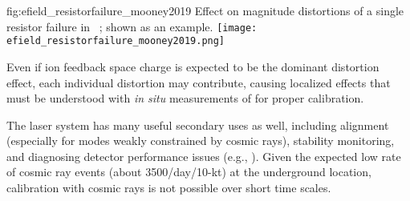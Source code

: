 \begin{dunefigure}{fig:efield_resistorfailure_mooney2019}
{Effect on \efield magnitude distortions of a single  resistor failure in ~\cite{bib:mooney2019a}; shown as an example. 
}
\texttt{[image: efield\_resistorfailure\_mooney2019.png]}
\end{dunefigure}


Even if ion feedback space charge is expected to be the dominant \efield distortion effect,
each individual \efield distortion may contribute, causing localized effects that must be understood with \textit{in situ} measurements of \efield for proper calibration. 

The laser system has many useful secondary uses as well, including alignment (especially for modes weakly constrained by cosmic rays),
stability monitoring, and diagnosing detector performance issues
(e.g., ).  
Given the expected low rate of cosmic ray events (about 3500/day/10-kt) at the underground location, calibration with cosmic rays is not possible over short time scales. 



